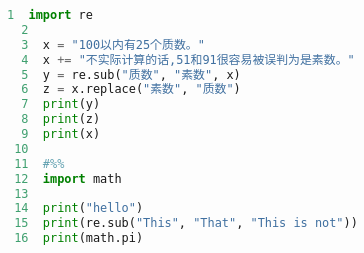 \begin{small}
\begin{spacing}{0.8}
\begin{lstlisting}[language=Python]
  1  import re
  2  
  3  x = "100以内有25个质数。"
  4  x += "不实际计算的话,51和91很容易被误判为是素数。"
  5  y = re.sub("质数", "素数", x)
  6  z = x.replace("素数", "质数")
  7  print(y)
  8  print(z)
  9  print(x)
 10  
 11  #%%
 12  import math
 13  
 14  print("hello")
 15  print(re.sub("This", "That", "This is not"))
 16  print(math.pi)
\end{lstlisting}
\end{spacing}
\end{small}
